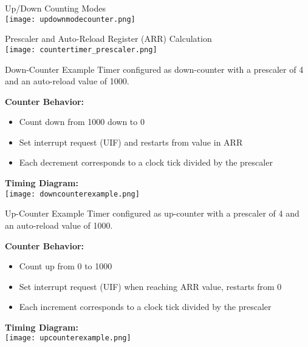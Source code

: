 \begin{theorem}{Up/Down Counting Modes}\\
    \texttt{[image: updownmodecounter.png]}
\end{theorem}

\begin{corollary}{Prescaler and Auto-Reload Register (ARR) Calculation}\\
    \texttt{[image: countertimer\_prescaler.png]}
\end{corollary}


\begin{example2}{Down-Counter Example}
    Timer configured as down-counter with a prescaler of 4 and an auto-reload value of 1000.
    
    \textbf{Counter Behavior:}
    \begin{itemize}
        \item Count down from 1000 down to 0
        \item Set interrupt request (UIF) and restarts from value in ARR
        \item Each decrement corresponds to a clock tick divided by the prescaler
    \end{itemize}
    
    \textbf{Timing Diagram:}\\
    \texttt{[image: downcounterexample.png]}
\end{example2}

\begin{example2}{Up-Counter Example}
    Timer configured as up-counter with a prescaler of 4 and an auto-reload value of 1000.
    
    \textbf{Counter Behavior:}
    \begin{itemize}
        \item Count up from 0 to 1000
        \item Set interrupt request (UIF) when reaching ARR value, restarts from 0
        \item Each increment corresponds to a clock tick divided by the prescaler
    \end{itemize}
    
    \textbf{Timing Diagram:}\\
    \texttt{[image: upcounterexample.png]}
\end{example2}

\multend



